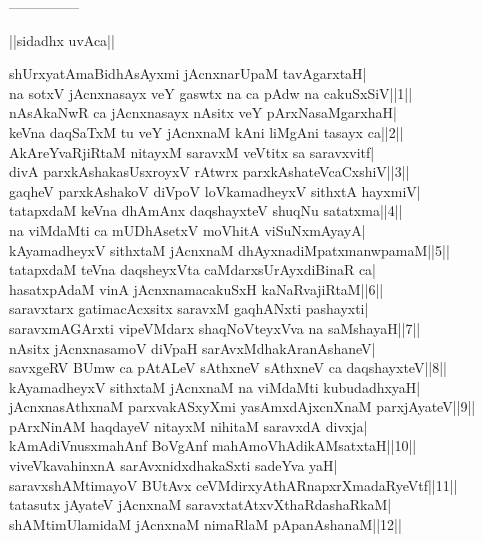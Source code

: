 \documentclass{article}
\begin{document}
\begin{center}
---------------
\end{center}

\begin{center}
||sidadhx uvAca||
\end{center}

shUrxyatAmaBidhAsAyxmi jAcnxnarUpaM tavAgarxtaH|\\
na sotxV jAcnxnasayx veY gaswtx na ca pAdw na cakuSxSiV||1||\\
nAsAkaNwR ca jAcnxnasayx nAsitx veY pArxNasaMgarxhaH|\\
keVna daqSaTxM tu veY jAcnxnaM kAni liMgAni tasayx ca||2||\\
AkAreYvaRjiRtaM nitayxM saravxM veVtitx sa saravxvitf|\\
divA parxkAshakasUsxroyxV rAtwrx parxkAshateVcaCxshiV||3||\\
gaqheV parxkAshakoV diVpoV loVkamadheyxV sithxtA hayxmiV|\\
tatapxdaM keVna dhAmAnx daqshayxteV shuqNu satatxma||4||\\
na viMdaMti ca mUDhAsetxV moVhitA viSuNxmAyayA|\\
kAyamadheyxV sithxtaM jAcnxnaM dhAyxnadiMpatxmanwpamaM||5||\\
tatapxdaM teVna daqsheyxVta caMdarxsUrAyxdiBinaR ca|\\
hasatxpAdaM vinA jAcnxnamacakuSxH kaNaRvajiRtaM||6||\\
saravxtarx gatimacAcxsitx saravxM gaqhANxti pashayxti|\\
saravxmAGArxti vipeVMdarx shaqNoVteyxVva na saMshayaH||7||\\
nAsitx jAcnxnasamoV diVpaH sarAvxMdhakAranAshaneV|\\
savxgeRV BUmw ca pAtALeV sAthxneV sAthxneV ca daqshayxteV||8||\\
kAyamadheyxV sithxtaM jAcnxnaM na viMdaMti kubudadhxyaH|\\
jAcnxnasAthxnaM parxvakASxyXmi yasAmxdAjxcnXnaM parxjAyateV||9||\\
pArxNinAM haqdayeV nitayxM nihitaM saravxdA divxja|\\
kAmAdiVnusxmahAnf BoVgAnf mahAmoVhAdikAMsatxtaH||10||\\
viveVkavahinxnA sarAvxnidxdhakaSxti sadeYva yaH|\\
saravxshAMtimayoV BUtAvx ceVMdirxyAthARnapxrXmadaRyeVtf||11||\\
tatasutx jAyateV jAcnxnaM saravxtatAtxvXthaRdashaRkaM|\\
shAMtimUlamidaM jAcnxnaM nimaRlaM pApanAshanaM||12||\\
\end{document}
